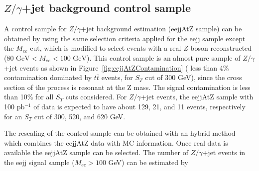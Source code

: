 %

\clearpage

\subsection{$Z/\gamma$+jet background control sample} \label{sec:ZcontrolSample}

A control sample for $Z/\gamma$+jet background estimation (eejjAtZ sample) 
can be obtained by using the same selection criteria applied for the eejj sample except 
the $M_{ee}$ cut, which is modified to select events with a real $Z$ boson reconstructed 
($80\mbox{ GeV} < M_{ee} < 100\mbox{ GeV}$). This control sample is an almost pure sample of  
$Z/\gamma$+jet events as shown in Figure~\ref{fig:eejjAtZContamination}   
( less than 4\% contamination dominated by $t\bar{t}$ events, for $S_{T}$ cut of 300 GeV), 
since the cross section of the process is resonant at the Z mass.
The signal contamination is less than 10\% for all $S_{T}$ cuts considered.  
For $Z/\gamma$+jet events, the eejjAtZ sample with 100 pb$^{-1}$ of data 
is expected to have about 129, 21, and 11 events, respectively for an $S_{T}$ cut of 300, 520, and 620 GeV.

The rescaling of the control sample can be obtained with an hybrid method which combines the eejjAtZ data with 
MC information. Once real data is available the eejjAtZ sample can be selected. 
The number of $Z/\gamma$+jet events in the eejj signal sample ($M_{ee}>100$ GeV) can be estimated by


